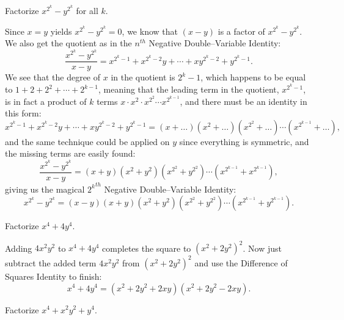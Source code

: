 \begin{tcolorbox}
\begin{question}[name=(${2^k}^{th}$ Negative Double--Variable Identity)]
Factorize $x^{2^k}-y^{2^k}$ for all $k$.
\end{question}
\end{tcolorbox}

\begin{solution}[name=Solution by Amir Parvardi]
Since $x=y$ yields $x^{2^k}-y^{2^k}=0$, we know that $(x-y)$ is a factor of $x^{2^k}-y^{2^k}$. We also get the quotient as in the $n^{th}$ Negative Double--Variable Identity:
$$\frac{x^{2^k}-y^{2^k}}{x-y} = x^{2^k-1}+x^{2^k-2}y+\cdots+xy^{2^k-2}+y^{2^k-1}.$$
We see that the degree of $x$ in the quotient is $2^k-1$, which happens to be equal to $1+2+2^2+\cdots+2^{k-1}$, meaning that the leading term in the quotient, $x^{2^k-1}$, is in fact a product of $k$ terms $x \cdot x^2 \cdot x^{2^2} \cdots x^{2^{k-1}}$, and there must be an identity in this form:
$$ x^{2^k-1}+x^{2^k-2}y+\cdots+xy^{2^k-2}+y^{2^k-1} = (x+\dots)(x^2+\dots)(x^{2^2}+\dots)\cdots (x^{2^{k-1}}+\dots),$$
and the same technique could be applied on $y$ since everything is symmetric, and the missing terms are easily found:
$$\frac{x^{2^k}-y^{2^k}}{x-y} =  (x+y)(x^2+y^2)(x^{2^2}+y^{2^2})\cdots (x^{2^{k-1}}+x^{2^{k-1}}),$$
giving us the magical ${2^k}^{th}$ Negative Double--Variable Identity:
$$x^{2^k}-y^{2^k} = (x-y)(x+y)(x^2+y^2)(x^{2^2}+y^{2^2})\cdots (x^{2^{k-1}}+y^{2^{k-1}}).$$
\end{solution}


\begin{tcolorbox}
\begin{question}[name=(Sophie Germain Identity)]
Factorize $x^4+4y^4$.
\end{question}
\end{tcolorbox}

\begin{solution}[name=Solution by Sophie Germain]
Adding $4x^2y^2$ to $x^4+4y^4$ completes the square to $(x^2+2y^2)^2$. Now just subtract the added term $4x^2y^2$ from $(x^2+2y^2)^2$ and use the Difference of Squares Identity to finish:
$$x^4+4y^4 = (x^2+2y^2+2xy)(x^2+2y^2-2xy).$$
\end{solution}


\begin{tcolorbox}
\begin{question}[name=(Sophie Parker Identity)]
Factorize $x^4+x^2y^2+y^4$.
\end{question}
\end{tcolorbox}

